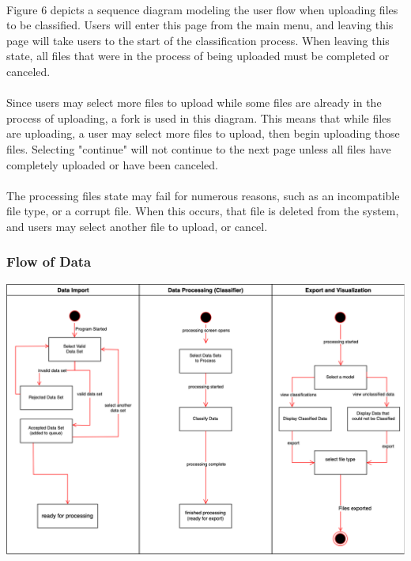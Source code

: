 \documentclass[12pt,oneside,letterpaper]{article}
\begin{document}
 
 \paragraph{} Figure 6 depicts a sequence diagram modeling the user flow when uploading files to be classified. Users will enter this page from the main menu, and leaving this page will take users to the start of the classification process. When leaving this state, all files that were in the process of being uploaded must be completed or canceled.
\paragraph{} Since users may select more files to upload while some files are already in the process of uploading, a fork is used in this diagram. This means that while files are uploading, a user may select more files to upload, then begin uploading those files. Selecting "continue" will not continue to the next page unless all files have completely uploaded or have been canceled.
\paragraph{} The processing files state may fail for numerous reasons, such as an incompatible file type, or a corrupt file. When this occurs, that file is deleted from the system, and users may select another file to upload, or cancel.
 
 \subsubsection{Flow of Data}
\includegraphics[scale = 0.40]{LandonStateDiagram.png}
\begingroup
{}
\endgroup
\end{document}
